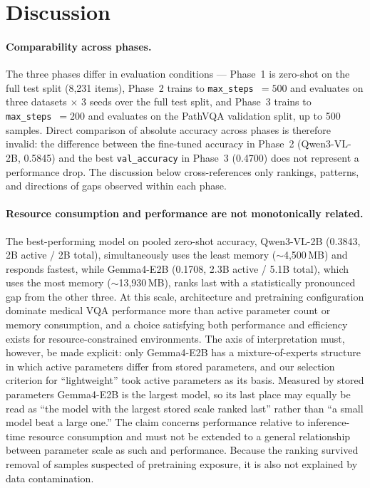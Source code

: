 \section{Discussion}
\label{sec:discussion}

\paragraph{Comparability across phases.}
The three phases differ in evaluation conditions --- Phase~1 is zero-shot on the
full test split (8,231 items), Phase~2 trains to \texttt{max\_steps}~$=500$ and
evaluates on three datasets $\times$ 3 seeds over the full test split, and
Phase~3 trains to \texttt{max\_steps}~$=200$ and evaluates on the PathVQA
validation split, up to 500 samples. Direct comparison of absolute accuracy
across phases is therefore invalid: the difference between the fine-tuned
accuracy in Phase~2 (Qwen3-VL-2B, 0.5845) and the best \texttt{val\_accuracy} in
Phase~3 (0.4700) does not represent a performance drop. The discussion below
cross-references only rankings, patterns, and directions of gaps observed within
each phase.

\paragraph{Resource consumption and performance are not monotonically related.}
The best-performing model on pooled zero-shot accuracy, Qwen3-VL-2B (0.3843,
2B active / 2B total), simultaneously uses the least memory ($\sim$4,500\,MB) and
responds fastest, while Gemma4-E2B (0.1708, 2.3B active / 5.1B total), which uses
the most memory ($\sim$13,930\,MB), ranks last with a statistically pronounced gap
from the other three. At this scale, architecture and pretraining configuration
dominate medical VQA performance more than active parameter count or memory
consumption, and a choice satisfying both performance and efficiency exists for
resource-constrained environments. The axis of interpretation must, however, be
made explicit: only Gemma4-E2B has a mixture-of-experts structure in which active
parameters differ from stored parameters, and our selection criterion for
``lightweight'' took active parameters as its basis. Measured by stored
parameters Gemma4-E2B is the largest model, so its last place may equally be read
as ``the model with the largest stored scale ranked last'' rather than ``a small
model beat a large one.'' The claim concerns performance relative to
inference-time resource consumption and must not be extended to a general
relationship between parameter scale as such and performance. Because the ranking
survived removal of samples suspected of pretraining exposure, it is also not
explained by data contamination.

